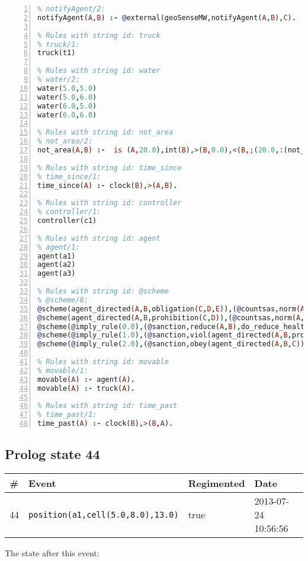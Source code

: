 \documentclass[11pt]{article}\usepackage[utf8]{inputenc}\usepackage{geometry}
\begin{document}
\begin{lstlisting}[language=Prolog, numbers=left]
% Rules with string id: notifyAgent
% notifyAgent/2:
notifyAgent(A,B) :- @external(geoSenseMW,notifyAgent(A,B),C).

% Rules with string id: truck
% truck/1:
truck(t1)

% Rules with string id: water
% water/2:
water(5.0,5.0)
water(5.0,6.0)
water(6.0,5.0)
water(6.0,6.0)

% Rules with string id: not_area
% not_area/2:
not_area(A,B) :-  is (A,20.0),int(B),>(B,0.0),<(B,;(20.0,:(not_area(A,B), is (-(B),20.0)))),int(A),>(A,0.0),<(A,;(20.0,:(area(A,B),-(int(A))))),int(B),>(A,0.0),>(B,0.0),<(A,21.0),<(B,21.0).

% Rules with string id: time_since
% time_since/1:
time_since(A) :- clock(B),>(A,B).

% Rules with string id: controller
% controller/1:
controller(c1)

% Rules with string id: agent
% agent/1:
agent(a1)
agent(a2)
agent(a3)

% Rules with string id: @scheme
% @scheme/8:
@scheme(agent_directed(A,B,obligation(C,D,E)),(@countsas,norm(A,B,F,obligation(C,D,E)),F),false,(listTrue(C)),(time_past(D)),false,[plus(viol(agent_directed(A,B,obligation(C,D,E))))|[]],[plus(obey(agent_directed(A,B,obligation(C,D,E))))|[]])
@scheme(agent_directed(A,B,prohibition(C,D)),(@countsas,norm(A,B,E,prohibition(C,D)),E),(listTrue(C)),false,(false),false,[plus(viol(agent_directed(A,B,prohibition(C,D))))|[]],[plus(obey(agent_directed(A,B,prohibition(C,D))))|[]])
@scheme(@imply_rule(0.0),(@sanction,reduce(A,B),do_reduce_health(A,B),notifyAgent(A,changed(status))),true,false,false,false,[min(reduce(A,B))|[]],[])
@scheme(@imply_rule(1.0),(@sanction,viol(agent_directed(A,B,prohibition(C,D))),do_sanction(D)),true,false,false,false,[min(viol(agent_directed(A,B,prohibition(C,D))))|[]],[])
@scheme(@imply_rule(2.0),(@sanction,obey(agent_directed(A,B,C))),true,false,false,false,[min(obey(agent_directed(A,B,C)))|[]],[])

% Rules with string id: movable
% movable/1:
movable(A) :- agent(A).
movable(A) :- truck(A).

% Rules with string id: time_past
% time_past/1:
time_past(A) :- clock(B),>(B,A).

\end{lstlisting}
\clearpage 
\subsection{Prolog state 44}
\begin{table}[ht]
\centering 
\begin{tabular}{l l l l} 
\textbf{\#} & \textbf{Event} & \textbf{Regimented} & \textbf{Date} \\ [0.5ex] 
\hline
44&\texttt{position(a1,cell(5.0,8.0),13.0)}&true&2013-07-24 10:56:56\\ [1ex] \hline\end{tabular}
\end{table}
The state after this event:
\end{document}
